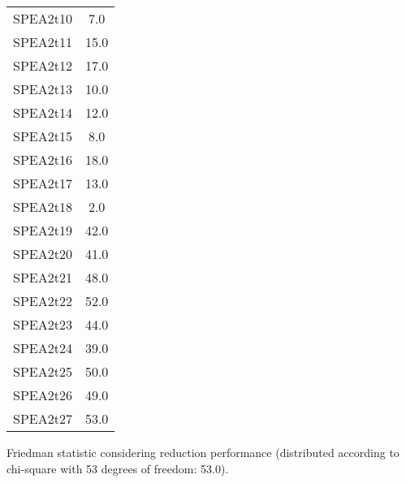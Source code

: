 \documentclass{article}
\begin{document}
\begin{table}[!htp]
\begin{tabular}{c|c}
SPEA2t10&7.0\\
SPEA2t11&15.0\\
SPEA2t12&17.0\\
SPEA2t13&10.0\\
SPEA2t14&12.0\\
SPEA2t15&8.0\\
SPEA2t16&18.0\\
SPEA2t17&13.0\\
SPEA2t18&2.0\\
SPEA2t19&42.0\\
SPEA2t20&41.0\\
SPEA2t21&48.0\\
SPEA2t22&52.0\\
SPEA2t23&44.0\\
SPEA2t24&39.0\\
SPEA2t25&50.0\\
SPEA2t26&49.0\\
SPEA2t27&53.0\\
\end{tabular}
\end{table}


Friedman statistic considering reduction performance (distributed according to chi-square with 53 degrees of freedom: 53.0).
\end{document}
